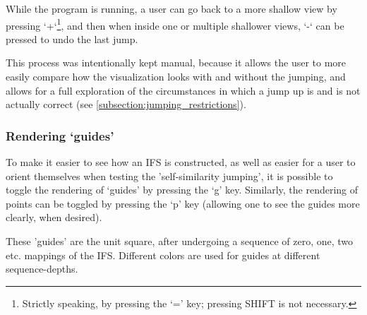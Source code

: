\documentclass[11pt]{article}
\begin{document}
While the program is running, a user can go back to a more shallow view by pressing `+`\footnote{Strictly speaking, by pressing the `=' key; pressing SHIFT is not necessary.}, and then when inside one or multiple shallower views,
`-` can be pressed to undo the last jump.

This process was intentionally kept manual, because it allows the user to more easily compare how
the visualization looks with and without the jumping, and allows for a full exploration of the circumstances
in which a jump up is and is not actually correct (see \autoref{subsection:jumping_restrictions}).
\subsubsection{Rendering `guides'}
\label{sec:org0c75402}

To make it easier to see how an IFS is constructed, as well as easier for a user to orient themselves when
testing the 'self-similarity jumping', it is possible to toggle the rendering of `guides' by pressing the `g' key.
Similarly, the rendering of points can be toggled by pressing the `p' key (allowing one to see the guides more clearly, when desired).

These 'guides' are the unit square, after undergoing a sequence of zero, one, two etc. mappings of the IFS.
Different colors are used for guides at different sequence-depths.
\end{document}

